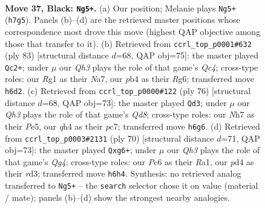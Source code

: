 \documentclass[11pt]{article}
\begin{document}
\clearpage

\begin{figure}[p]\centering
\begin{subfigure}{0.46\textwidth}\centering
\resizebox{\linewidth}{!}{%
\newchessgame
\chessboard[
  setfen={7k/p2p3n/2p2p1q/8/1P1P3Q/6RK/5P1P/6r1 b - - 7 37},
  showmover=false,
  pgfstyle=straightmove, color=movearrow, markmove={h7-g5}
]}
\caption{}
\end{subfigure}\hfill
\begin{subfigure}{0.46\textwidth}\centering
\resizebox{\linewidth}{!}{%
\newchessgame
\chessboard[
  setfen={k7/nR3p2/p3p1r1/2qpP3/8/4Q3/5K2/1R6 b - - 1 42},
  showmover=false,
  pgfstyle=straightmove, color=movearrow, markmove={c5-c2}
]}
\caption{}
\end{subfigure}
\\[4pt]
\begin{subfigure}{0.46\textwidth}\centering
\resizebox{\linewidth}{!}{%
\newchessgame
\chessboard[
  setfen={3Q1qk1/1pp3r1/p3p3/4P3/6p1/P7/1PP5/1K4R1 w - - 4 39},
  showmover=false,
  pgfstyle=straightmove, color=movearrow, markmove={d8-d3}
]}
\caption{}
\end{subfigure}\hfill
\begin{subfigure}{0.46\textwidth}\centering
\resizebox{\linewidth}{!}{%
\newchessgame
\chessboard[
  setfen={4R3/5pkr/p5q1/1pp5/6Q1/1P1r2P1/5P2/R5K1 w - - 9 36},
  showmover=false,
  pgfstyle=straightmove, color=movearrow, markmove={g4-g6}
]}
\caption{}
\end{subfigure}
\caption{\textbf{Move 37, Black: \texttt{Ng5+}.} (a) Our position; Melanie plays \texttt{Ng5+} (\texttt{h7g5}). Panels (b)--(d) are the retrieved master positions whose correspondence most drove this move (highest QAP objective among those that transfer to it). (b) Retrieved from \texttt{ccrl\_top\_p0001\#632} (ply 83) [structural distance $d$=68, QAP obj=75]: the master played \texttt{Qc2+}; under $\mu$ our \emph{Qh3} plays the role of that game's \emph{Qc4}; cross-type roles: our \emph{R}g1 as their \emph{N}a7, our \emph{p}b4 as their \emph{R}g6; transferred move \texttt{h6d2}. (c) Retrieved from \texttt{ccrl\_top\_p0000\#122} (ply 76) [structural distance $d$=68, QAP obj=73]: the master played \texttt{Qd3}; under $\mu$ our \emph{Qh3} plays the role of that game's \emph{Qd8}; cross-type roles: our \emph{N}h7 as their \emph{P}e5, our \emph{q}h4 as their \emph{p}c7; transferred move \texttt{h6g6}. (d) Retrieved from \texttt{ccrl\_top\_p0003\#2131} (ply 70) [structural distance $d$=71, QAP obj=73]: the master played \texttt{Qxg6+}; under $\mu$ our \emph{Qh3} plays the role of that game's \emph{Qg4}; cross-type roles: our \emph{P}c6 as their \emph{R}a1, our \emph{p}d4 as their \emph{r}d3; transferred move \texttt{h6h4}. Synthesis: no retrieved analog transferred to \texttt{Ng5+} -- the \texttt{search} selector chose it on value (material / mate); panels (b)--(d) show the strongest nearby analogies.}
\label{fig:thought-m73}
\end{figure}
\end{document}
